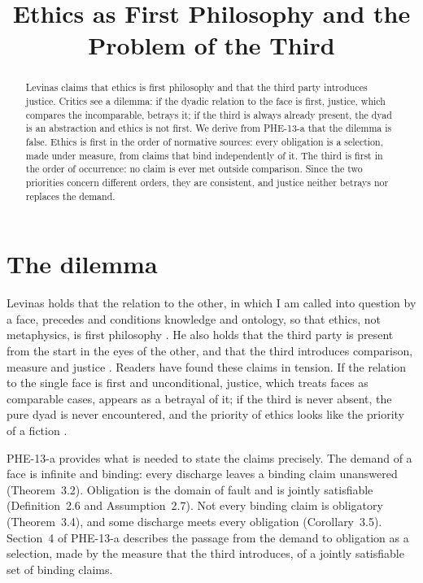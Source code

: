 \documentclass{situationist-preprint}
\title{Ethics as First Philosophy and the Problem of the Third}
\begin{document}
\maketitle

\begin{abstract}
Levinas claims that ethics is first philosophy and that the third party introduces justice. Critics see a dilemma: if the dyadic relation to the face is first, justice, which compares the incomparable, betrays it; if the third is always already present, the dyad is an abstraction and ethics is not first. We derive from PHE-13-a that the dilemma is false. Ethics is first in the order of normative sources: every obligation is a selection, made under measure, from claims that bind independently of it. The third is first in the order of occurrence: no claim is ever met outside comparison. Since the two priorities concern different orders, they are consistent, and justice neither betrays nor replaces the demand.
\end{abstract}

\section{The dilemma}

Levinas holds that the relation to the other, in which I am called into question by a face, precedes and conditions knowledge and ontology, so that ethics, not metaphysics, is first philosophy \citep{Levinas1961,Levinas1984}. He also holds that the third party is present from the start in the eyes of the other, and that the third introduces comparison, measure and justice \citep[V.3]{Levinas1974}. Readers have found these claims in tension. If the relation to the single face is first and unconditional, justice, which treats faces as comparable cases, appears as a betrayal of it; if the third is never absent, the pure dyad is never encountered, and the priority of ethics looks like the priority of a fiction \citep{Derrida1997,Critchley1992}.

PHE-13-a provides what is needed to state the claims precisely. The demand of a face is infinite and binding: every discharge leaves a binding claim unanswered (Theorem~3.2). Obligation is the domain of fault and is jointly satisfiable (Definition~2.6 and Assumption~2.7). Not every binding claim is obligatory (Theorem~3.4), and some discharge meets every obligation (Corollary~3.5). Section~4 of PHE-13-a describes the passage from the demand to obligation as a selection, made by the measure that the third introduces, of a jointly satisfiable set of binding claims.
\end{document}
